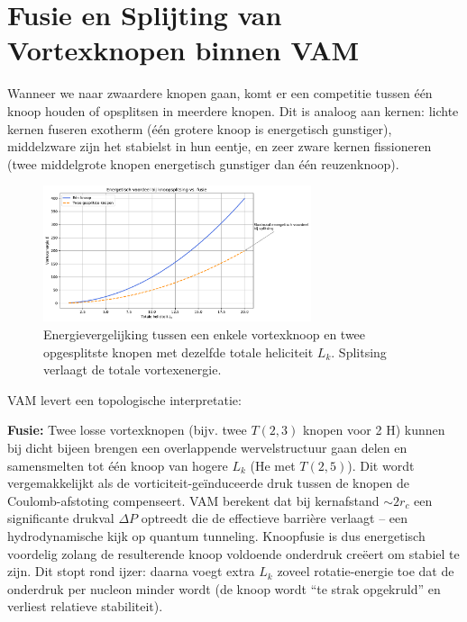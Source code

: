 \section{Fusie en Splijting van Vortexknopen binnen VAM}

Wanneer we naar zwaardere knopen gaan, komt er een competitie tussen één knoop houden of opsplitsen in meerdere knopen. Dit is analoog aan kernen: lichte kernen fuseren exotherm (één grotere knoop is energetisch gunstiger), middelzware zijn het stabielst in hun eentje, en zeer zware kernen fissioneren (twee middelgrote knopen energetisch gunstiger dan één reuzenknoop).

\begin{figure}[H]
    \centering
    \includegraphics[width=0.7\textwidth]{sections/3_EnergetischVoordeel}
    \caption{Energievergelijking tussen een enkele vortexknoop en twee opgesplitste knopen met dezelfde totale heliciteit $L_k$. Splitsing verlaagt de totale vortexenergie.}
    \label{fig:fusie_splitsing}
\end{figure}

VAM levert een topologische interpretatie:

\textbf{Fusie:} Twee losse vortexknopen (bijv. twee $T(2,3)$ knopen voor 2 H) kunnen bij dicht bijeen brengen een overlappende wervelstructuur gaan delen en samensmelten tot één knoop van hogere $L_k$ (He met $T(2,5)$). Dit wordt vergemakkelijkt als de vorticiteit-geïnduceerde druk tussen de knopen de Coulomb-afstoting compenseert. VAM berekent dat bij kernafstand $\sim 2r_c$ een significante drukval $\Delta P$ optreedt die de effectieve barrière verlaagt – een hydrodynamische kijk op quantum tunneling. Knoopfusie is dus energetisch voordelig zolang de resulterende knoop voldoende onderdruk creëert om stabiel te zijn. Dit stopt rond ijzer: daarna voegt extra $L_k$ zoveel rotatie-energie toe dat de onderdruk per nucleon minder wordt (de knoop wordt “te strak opgekruld” en verliest relatieve stabiliteit).

